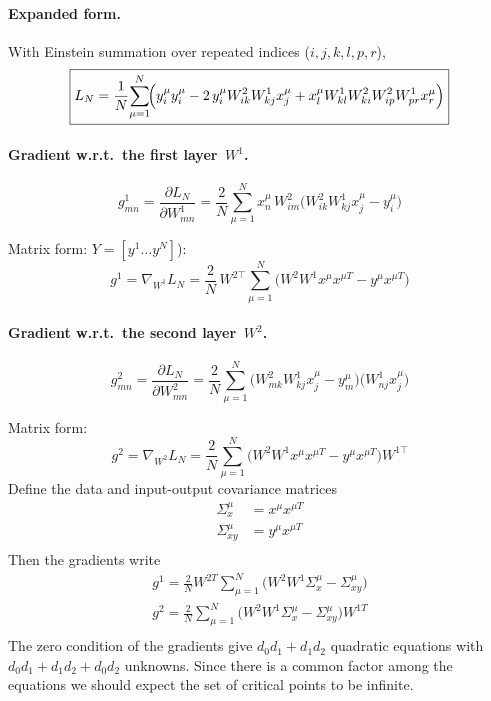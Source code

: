 \documentclass[11pt]{article}
\begin{document}
\paragraph{Expanded form.}
With Einstein summation over repeated indices (\(i,j,k,l,p,r\)),
\[
\boxed{
L_N=\frac{1}{N}\!
     \sum_{\mu=1}^{N}\!
     \Bigl(
           y^{\mu}_{i}y^{\mu}_{i}
           -2\,y^{\mu}_{i}W^{2}_{ik}W^{1}_{kj}x^{\mu}_{j}
           +x^{\mu}_{l}W^{1}_{kl}W^{2}_{ki}W^{2}_{ip}W^{1}_{pr}x^{\mu}_{r}
     \Bigr)}
\]
\paragraph{Gradient w.r.t.\ the first layer \(\,W^{1}\).}
\[
\boxed{
g^{1}_{mn}
   =\frac{\partial L_N}{\partial W^{1}_{mn}}
   =\frac{2}{N}\sum_{\mu=1}^{N}
     x^{\mu}_{n}\,
     W^{2}_{i m}
     \bigl(
           W^{2}_{i k}W^{1}_{k j}x^{\mu}_{j}-y^{\mu}_{i}
     \bigr)}
\]

\noindent
Matrix form:
\(Y=[y^{1}\!\dots y^{N}]\)):
\[
\boxed{
g^1 = \nabla_{W^{1}}L_N
   =\frac{2}{N}\,W^{2\!\top} \sum_{\mu=1}^{N}
     \bigl(W^{2}W^{1}x^{\mu}x^{\mu T}-y^{\mu}x^{\mu T}\bigr)}
\]

\paragraph{Gradient w.r.t.\ the second layer \(\,W^{2}\).}
\[
\boxed{
g^{2}_{mn}
   =\frac{\partial L_N}{\partial W^{2}_{mn}}
   =\frac{2}{N}\sum_{\mu=1}^{N}
     \bigl(
          W^{2}_{m k}W^{1}_{k j}x^{\mu}_{j}-y^{\mu}_{m}
     \bigr)
     \bigl(
          W^{1}_{n j}x^{\mu}_{j}
     \bigr)}
\]

\noindent
Matrix form:
\[
\boxed{
g^2 = \nabla_{W^{2}}L_N
   =\frac{2}{N}\sum_{\mu=1}^{N}
     \bigl(W^{2}W^{1}x^{\mu}x^{\mu T}-y^{\mu}x^{\mu T}\bigr)W^{1\!\top}}
\]
Define the data and input-output covariance matrices  
\begin{align}
    \Sigma_x^{\mu} & = x^{\mu}x^{\mu T}\\
    \Sigma_{xy}^{\mu} & = y^{\mu}x^{\mu T}\\
\end{align}
Then the gradients write
\begin{align}   
   g^1 = \frac{2}{N} W^{2T}\sum_{\mu=1}^{N}\bigl(W^2W^1\Sigma_x^{\mu} - \Sigma_{xy}^{\mu}\bigr)\\
   g^2 = \frac{2}{N} \sum_{\mu=1}^{N}\bigl(W^2W^1\Sigma_x^{\mu} - \Sigma_{xy}^{\mu}\bigr)W^{1T}\\
\end{align}
The zero condition of the gradients give $d_0d_1 + d_1d_2$ quadratic equations with $d_0d_1 + d_1d_2 + d_0d_2$ unknowns. Since there is a common factor among the equations we should expect the set of critical points to be infinite.
\end{document}
